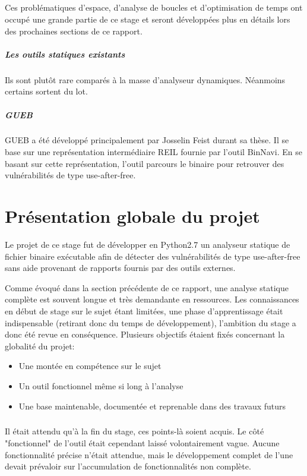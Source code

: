 \subparagraph{}
Ces problématiques d'espace, d'analyse de boucles et d'optimisation de temps ont occupé une grande partie de ce stage et seront développées plus
en détails lors des prochaines sections de ce rapport.

\subparagraph{Les outils statiques existants}
Ils sont plutôt rare comparés à la masse d'analyseur dynamiques. Néanmoins certains sortent du lot.

\subparagraph{GUEB}
GUEB a été développé principalement par Josselin Feist durant sa thèse. Il se base sur une représentation intermédiaire
REIL fournie par l'outil BinNavi. En se basant sur cette représentation, l'outil parcours le binaire pour retrouver des vulnérabilités
de type use-after-free.
\newpage
\section{Présentation globale du projet}

Le projet de ce stage fut de développer en Python2.7 un analyseur statique de fichier
binaire exécutable afin de détecter des vulnérabilités de type use-after-free sans aide
provenant de rapports fournis par des outils externes.


Comme évoqué dans la section précédente de ce rapport, une analyse statique complète est souvent
longue et très demandante en ressources. Les connaissances en début de stage sur le sujet étant limitées,
une phase d'apprentissage était indispensable (retirant donc du temps de développement), l'ambition du stage
a donc été revue en conséquence.\newline
Plusieurs objectifs étaient fixés concernant la globalité du projet:
\begin{itemize}
        \item Une montée en compétence sur le sujet
        \item Un outil fonctionnel même si long à l'analyse
        \item Une base maintenable, documentée et reprenable dans des travaux futurs
\end{itemize}
\subparagraph{}

Il était attendu qu'à la fin du stage, ces points-là soient acquis. Le côté "fonctionnel"
de l'outil était cependant laissé volontairement vague. Aucune fonctionnalité précise n'était attendue, mais le développement complet de l'une devait prévaloir sur l'accumulation de fonctionnalités non complète.

